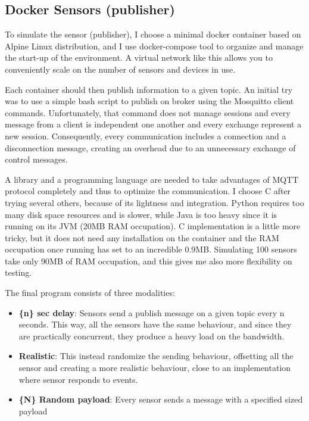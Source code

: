 \documentclass[journal]{IEEEtran}
\begin{document}
\subsection{Docker Sensors (publisher)}
\label{sec:sensors}
To simulate the sensor (publisher), I choose a minimal docker container based on Alpine Linux distribution, and I use docker-compose tool to organize and manage the start-up of the environment. 
A virtual network like this allows you to conveniently scale on the number of sensors and devices in use.

Each container should then publish information to a given topic. An initial try was to use a simple bash script to publish on broker using the Mosquitto client commands. Unfortunately, that command does not manage sessions and every message from a client is independent one another and every exchange represent a new session. Consequently, every communication includes a connection and a disconnection message, creating an overhead due to an unnecessary exchange of control messages.

A library and a programming language are needed to take advantages of MQTT protocol completely and thus to optimize the communication. I choose C after trying several others, because of its lightness and integration. 
Python requires too many disk space resources and is slower, while Java is too heavy since it is running on its JVM (20MB RAM occupation). 
C implementation is a little more tricky, but it does not need any installation on the container and the RAM occupation once running has set to an incredible 0.9MB. Simulating 100 sensors take only 90MB of RAM occupation, and this gives me also more flexibility on testing. 

The final program consists of three modalities: 

\begin{itemize}
	\item \textbf{\{n\} sec delay}: Sensors send a publish message on a given topic every {n} seconds. This way, all the sensors have the same behaviour, and since they are practically concurrent, they produce a heavy load on the bandwidth. 
	\item \textbf{Realistic}: This instead randomize the sending behaviour, offsetting all the sensor and creating a more realistic behaviour, close to an implementation where sensor responds to events. 
	\item \textbf{\{N\} Random payload}: Every sensor sends a message with a specified sized payload
\end{itemize}
\end{document}

